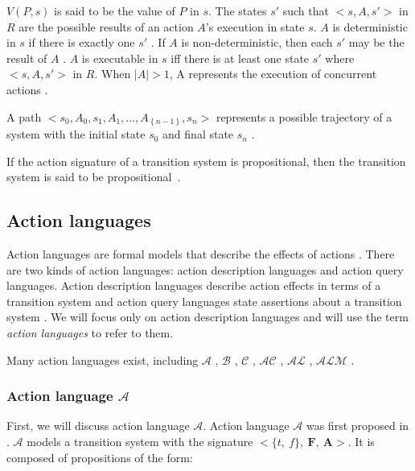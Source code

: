 $ V(P,s) $ is said to be the value of $ P $ in $ s $.
The states $ s' $ such that $ <s, A, s'> $ in $ R $ are the possible results of an action $ A $'s execution in state $ s $.
$ A $ is deterministic in $ s $ if there is exactly one $ s' $ \cite{gelfond_action_1998}.
If $ A $ is non-deterministic, then each $ s' $ may be the result of $ A $ \cite{blount_architecture_2013}.
$ A $ is executable in $ s $ iff there is at least one state $ s' $ where $ <s, A, s'> $ in $ R $.
When $ \left|A\right|>1 $, A represents the execution of concurrent actions \cite{gelfond_action_1998, blount_architecture_2013}.

A path $ <s_0, A_0, s_1, A_1, \ldots, A_{\left\{n-1\right\}}, s_n> $ represents a possible trajectory of a system with the initial state $ s_0 $ and final state $ s_n $ \cite{blount_architecture_2013}.

If the action signature of a transition system is propositional, then the transition system is said to be propositional~\cite{gelfond_action_1998}.

\subsection{Action languages}
\label{subsec:action_languages}

Action languages are formal models that describe the effects of actions \cite{gelfond_action_1998}.
There are two kinds of action languages: action description languages and action query languages.
Action description languages describe action effects in terms of a transition system and action query languages state assertions about a transition system \cite{gelfond_action_1998}.
We will focus only on action description languages and will use the term \textit{action languages} to refer to them.

Many action languages exist, including $ \mathcal{A} $ \cite{gelfond_action_1998}, $ \mathcal{B} $ \cite{gelfond_action_1998}, $ \mathcal{C} $ \cite{gelfond_action_1998}, $ \mathcal{AC} $ \cite{turner_representing_1997}, $ \mathcal{AL} $ \cite{baral_reasoning_2000}, $ \mathcal{ALM} $ \cite{inclezan_modular_2016}.

\subsubsection{Action language $ \mathcal{A} $}
\label{subsubsec:action_language_a}

First, we will discuss action language $ \mathcal{A} $.
Action language $ \mathcal{A} $ was first proposed in \cite{pednault_formulating_1987}.
$ \mathcal{A} $ models a transition system with the signature $ <\{t,\ f\},\ \boldsymbol{F},\ \boldsymbol{A}> $.
It is composed of propositions of the form:

